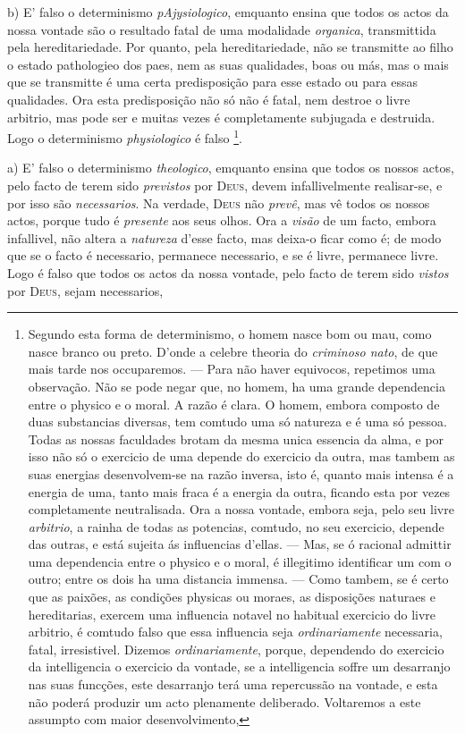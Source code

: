 b) E' falso o determinismo \emph{pAjysiologico}, emquanto ensina que todos os actos da nossa vontade são o resultado fatal de uma modalidade \emph{organica}, transmittida pela hereditariedade. Por quanto, pela hereditariedade, não se transmitte ao filho o estado pathologieo dos paes, nem as suas qualidades, boas ou más, mas o mais que se transmitte é uma certa predisposição para esse estado ou para essas qualidades. Ora esta predisposição não só não é fatal, nem destroe o livre arbitrio, mas pode ser e muitas vezes é completamente subjugada e destruida. Logo o determinismo \emph{physiologico} é falso \footnote{Segundo esta forma de determinismo, o homem nasce bom ou mau, como nasce branco ou preto. D'onde a celebre theoria do \emph{criminoso nato}, de que mais tarde nos occuparemos. --- Para não haver equivocos, repetimos uma observação. Não se pode negar que, no homem, ha uma grande dependencia entre o physico e o moral. A razão é clara. O homem, embora composto de duas substancias diversas, tem comtudo uma só natureza e é uma só pessoa. Todas as nossas faculdades brotam da mesma unica essencia da alma, e por isso não só o exercicio de uma depende do exercicio da outra, mas tambem as suas energias desenvolvem-se na razão inversa, isto é, quanto mais intensa é a energia de uma, tanto mais fraca é a energia da outra, ficando esta por vezes completamente neutralisada. Ora a nossa vontade, embora seja, pelo seu livre \emph{arbitrio}, a rainha de todas as potencias, comtudo, no seu exercicio, depende das outras, e está sujeita ás influencias d'ellas. --- Mas, se ó racional admittir uma dependencia entre o physico e o moral, é illegitimo identificar um com o outro; entre os dois ha uma distancia immensa. --- Como tambem, se é certo que as paixões, as condições physicas ou moraes, as disposições naturaes e hereditarias, exercem uma influencia notavel no habitual exercicio do livre arbitrio, é comtudo falso que essa influencia seja \emph{ordinariamente} necessaria, fatal, irresistivel. Dizemos \emph{ordinariamente}, porque, dependendo do exercicio da intelligencia o exercicio da vontade, se a intelligencia soffre um desarranjo nas suas funcções, este desarranjo terá uma repercussão na vontade, e esta não poderá produzir um acto plenamente deliberado. Voltaremos a este assumpto com maior desenvolvimento,}.


 

a) E' falso o determinismo \emph{theologico}, emquanto ensina que todos os nossos actos, pelo facto de terem sido \emph{previstos} por \textsc{Deus}, devem infallivelmente realisar-se, e por isso são \emph{necessarios}. Na verdade, \textsc{Deus} não \emph{prevê}, mas vê todos os nossos actos, porque tudo é \emph{presente} aos seus olhos. Ora a \emph{visão} de um facto, embora infallivel, não altera a \emph{natureza} d'esse facto, mas deixa-o ficar como é; de modo que se o facto é necessario, permanece necessario, e se é livre, permanece livre. Logo é falso que todos os actos da nossa vontade, pelo facto de terem sido \emph{vistos} por \textsc{Deus}, sejam necessarios,

